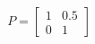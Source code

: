 \documentclass[preview]{standalone}
\begin{document}
\begin{align*}
P = \begin{bmatrix} 1 & 0.5 \\ 0 & 1 \end{bmatrix}
\end{align*}
\end{document}
